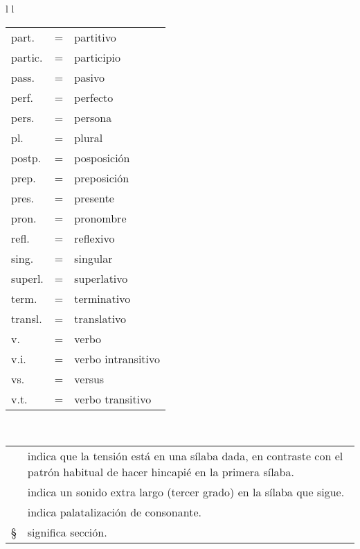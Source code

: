 \begin{tabular}{ l l }
\begin{tabular}{ l c l }
	part.	& = & partitivo \\
	partic.	& = & participio \\
	pass.	& = & pasivo \\
	perf.	& = & perfecto \\
	pers.	& = & persona \\
	pl.		& = & plural \\
	postp.	& = & posposición \\
	prep.	& = & preposición \\
	pres.	& = & presente \\
	pron.	& = & pronombre \\
	refl.	& = & reflexivo \\
	sing.	& = & singular \\
	superl.	& = & superlativo \\
	term.	& = & terminativo \\
	transl.	& = & translativo \\
	v.		& = & verbo \\
	v.i.	& = & verbo intransitivo \\
	vs.		& = & versus \\
	v.t.	& = & verbo transitivo
	\end{tabular}
\end{tabular}\\ \bigskip

\begin{tabular}{ l p{10cm} }
	\textasciiacute & indica que la tensión está en una sílaba dada, en contraste con el patrón habitual de hacer hincapié en la primera sílaba. \\
	\textasciigrave & indica un sonido extra largo (tercer grado) en la sílaba que sigue. \\
	\textquotesingle & indica palatalización de consonante. \\
	\S & significa sección.
\end{tabular}		

\vfill
